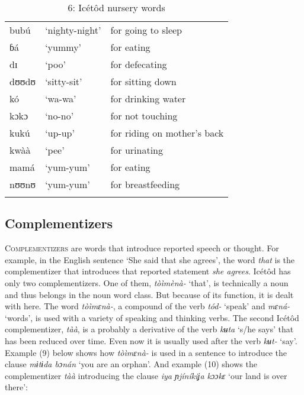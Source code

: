 \begin{table}
\caption{6: Icétôd nursery words}
\label{tab:3}


\begin{tabularx}{\textwidth}{XXX}
\lsptoprule

bubú & ‘nighty-night’ & for going to sleep\\
ɓá & ‘yummy’ & for eating\\
dɪ & ‘poo’ & for defecating\\
dʊʊdʊ & ‘sitty-sit’ & for sitting down\\
kó & ‘wa-wa’ & for drinking water\\
kɔkɔ & ‘no-no’ & for not touching\\
kukú & ‘up-up’ & for riding on mother’s back\\
kwàà & ‘pee’ & for urinating\\
mamá & ‘yum-yum’ & for eating\\
nʊʊnʊ & ‘yum-yum’ & for breastfeeding\\
\lspbottomrule
\end{tabularx}
\end{table}



\subsection{Complementizers}


\textsc{Complementizers} are words that introduce reported speech or thought. For example, in the English sentence ‘She said that she agrees’, the word \textit{that} is the complementizer that introduces that reported statement \textit{she agrees}. Icétôd has only two complementizers. One of them, \textit{tòìmènà- }‘that’, is technically a noun and thus belongs in the noun word class. But because of its function, it is dealt with here. The word \textit{tòìmɛnà-}, a compound of the verb \textit{tód-} ‘speak’ and \textit{mɛná- }‘words’, is used with a variety of speaking and thinking verbs. The second Icétôd complementizer, \textit{tàà}, is a probably a derivative of the verb \textit{kʉta }‘s/he says’ that has been reduced over time. Even now it is usually used after the verb \textit{kʉt- }‘say’. Example (9) below shows how \textit{tòìmɛnà- }is used in a sentence to introduce the clause \textit{mɨtɨda bɔnán }‘you are an orphan’. And example (10) shows the complementizer \textit{tàà }introducing the clause \textit{iya ɲjíníkiʝa kɔɔkɛ }‘our land is over there’:




